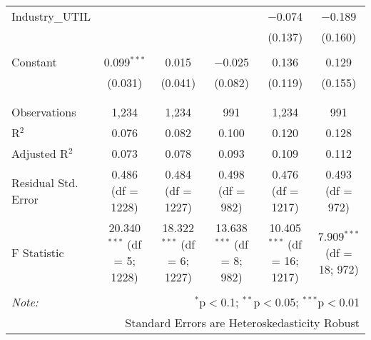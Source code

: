 \begin{table}[!htbp]
\begin{tabular}{@{\extracolsep{5pt}}lccccc}
 Industry\_UTIL &  &  &  & $-$0.074 & $-$0.189 \\ 
  &  &  &  & (0.137) & (0.160) \\ 
  & & & & & \\ 
 Constant & 0.099$^{***}$ & 0.015 & $-$0.025 & 0.136 & 0.129 \\ 
  & (0.031) & (0.041) & (0.082) & (0.119) & (0.155) \\ 
  & & & & & \\ 
\hline \\[-1.8ex] 
Observations & 1,234 & 1,234 & 991 & 1,234 & 991 \\ 
R$^{2}$ & 0.076 & 0.082 & 0.100 & 0.120 & 0.128 \\ 
Adjusted R$^{2}$ & 0.073 & 0.078 & 0.093 & 0.109 & 0.112 \\ 
Residual Std. Error & 0.486 (df = 1228) & 0.484 (df = 1227) & 0.498 (df = 982) & 0.476 (df = 1217) & 0.493 (df = 972) \\ 
F Statistic & 20.340$^{***}$ (df = 5; 1228) & 18.322$^{***}$ (df = 6; 1227) & 13.638$^{***}$ (df = 8; 982) & 10.405$^{***}$ (df = 16; 1217) & 7.909$^{***}$ (df = 18; 972) \\ 
\hline 
\hline \\[-1.8ex] 
\textit{Note:}  & \multicolumn{5}{r}{$^{*}$p$<$0.1; $^{**}$p$<$0.05; $^{***}$p$<$0.01} \\ 
 & \multicolumn{5}{r}{Standard Errors are Heteroskedasticity Robust} \\ 
\end{tabular} 
\end{table} 
